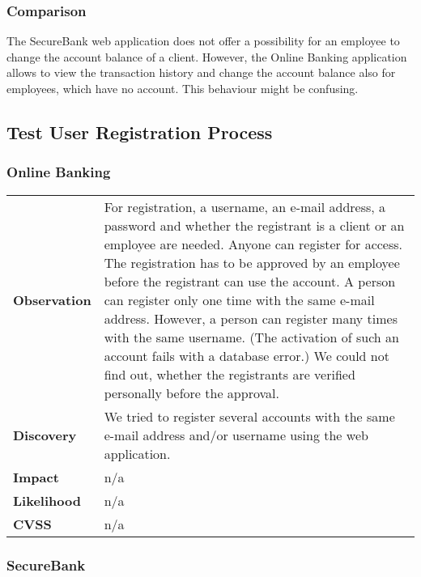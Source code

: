 \subsubsection*{Comparison}
The SecureBank web application does not offer a possibility for an employee to change the account balance of a client. However, the Online Banking application allows to view the transaction history and change the account balance also for employees, which have no account. This behaviour might be confusing.

\clearpage


\subsection{Test User Registration Process}

\subsubsection*{Online Banking}

\begin{tabular}{l|p{10cm}}

\textbf{Observation} & For registration, a username, an e-mail address, a password and whether the registrant is a client or an employee are needed. Anyone can register for access. The registration has to be approved by an employee before the registrant can use the account. A person can register only one time with the same e-mail address. However, a person can register many times with the same username. (The activation of such an account fails with a database error.) We could not find out, whether the registrants are verified personally before the approval. \\
\textbf{Discovery} & We tried to register several accounts with the same e-mail address and/or username using the web application. \\
\textbf{Impact} & n/a \\
\textbf{Likelihood} & n/a \\
\textbf{CVSS} & n/a \\
\end{tabular}

\subsubsection*{SecureBank}

